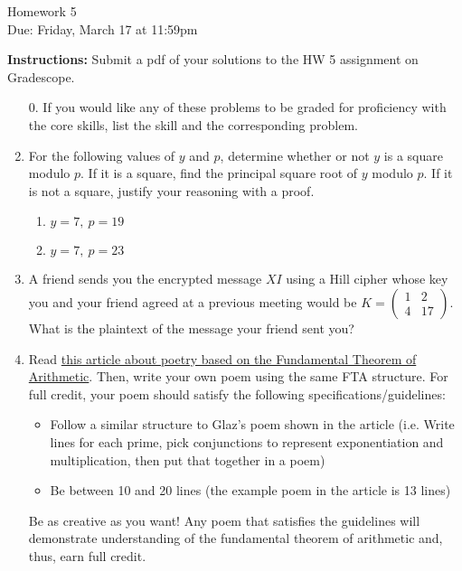 \documentclass[12pt]{article}
\begin{document}
\begin{center}
{\Large Homework 5}\\
Due: Friday,  March 17 at 11:59pm\\


\end{center}
{\bf Instructions:} Submit a pdf of your solutions to the HW 5 assignment on Gradescope.  



\begin{enumerate}
\item[0.] If you would like any of these problems to be graded for proficiency with the core skills, list the skill and the corresponding problem. 

\item For the following values of $y$ and $p$, determine whether or not $y$ is a square modulo $p$. If it is a square, find the principal square root of $y$ modulo $p$.  If it is not a square, justify your reasoning with a proof.
\begin{enumerate}
\item $y=7, \ p=19$
\item  $y=7, \ p=23$
\end{enumerate}

 \item  A friend sends you the encrypted message $XI$ using a Hill cipher whose key you and your friend agreed at a previous meeting would be $K = \begin{pmatrix}
1 & 2\\ 
4 & 17
\end{pmatrix}$.  What is the plaintext of the message your friend sent you?\\


 \item Read \href{https://blogs.scientificamerican.com/roots-of-unity/prime-factorization-as-verse/}{this article about poetry based on the Fundamental Theorem of Arithmetic}.  Then, write your own poem using the same FTA structure. For full credit, your poem should satisfy the following specifications/guidelines:
\begin{itemize}
\item Follow a similar structure to Glaz's poem shown in the article (i.e.  Write lines for each prime, pick conjunctions to represent exponentiation and multiplication, then put that together in a poem)
\item Be between 10 and 20 lines (the example poem in the article is 13 lines)
\end{itemize}
Be as creative as you want! Any poem that satisfies the guidelines will demonstrate understanding of the fundamental theorem of arithmetic and, thus, earn full credit. 

\end{enumerate}
\end{document}
